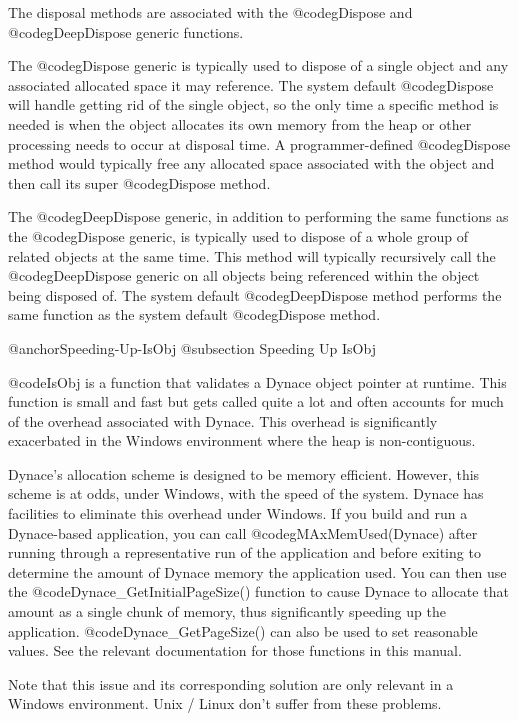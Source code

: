 The disposal methods are associated with the @code{gDispose}
and @code{gDeepDispose} generic functions.

The @code{gDispose} generic is typically used to dispose of a single
object and any associated allocated space it may reference.  The system
default @code{gDispose} will handle getting rid of the single object, so
the only time a specific method is needed is when the object
allocates its own memory from the heap or other processing needs to
occur at disposal time.  A programmer-defined @code{gDispose} method
would typically free any allocated space associated with the object and
then call its super @code{gDispose} method.

The @code{gDeepDispose} generic, in addition to performing the same
functions as the @code{gDispose} generic, is typically used to dispose
of a whole group of related objects at the same time.  This method will
typically recursively call the @code{gDeepDispose} generic on all
objects being referenced within the object being disposed of.  The system
default @code{gDeepDispose} method performs the same function as the
system default @code{gDispose} method.

@anchor{Speeding-Up-IsObj}
@subsection Speeding Up IsObj

@code{IsObj} is a function that validates a Dynace object pointer at
runtime.  This function is small and fast but gets called
quite a lot and often accounts for much of the overhead associated
with Dynace.  This overhead is significantly exacerbated in the
Windows environment where the heap is non-contiguous.

Dynace's allocation scheme is designed to be memory efficient.
However, this scheme is at odds, under Windows, with the speed of the
system. Dynace has facilities to eliminate this overhead under
Windows.  If you build and run a Dynace-based application, you can
call @code{gMAxMemUsed(Dynace)} after running through a representative
run of the application and before exiting to determine the amount of
Dynace memory the application used.  You can then use the
@code{Dynace_GetInitialPageSize()} function to cause Dynace to
allocate that amount as a single chunk of memory, thus significantly
speeding up the application.  @code{Dynace_GetPageSize()} can also
be used to set reasonable values.  See the relevant documentation
for those functions in this manual.

Note that this issue and its corresponding solution are only relevant
in a Windows environment.  Unix / Linux don't suffer from these problems.

